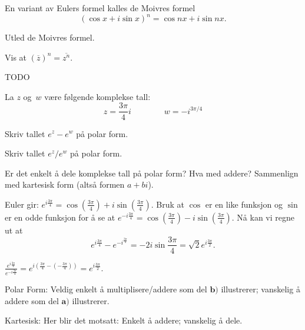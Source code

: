 \begin{oppgave}
En variant av Eulers formel kalles de Moivres formel
\[
(\cos x + i\sin x)^n=\cos nx + i\sin nx.
\]
\begin{punkt}
Utled de Moivres formel.
\end{punkt}

\begin{punkt}
Vis at $(\overline z)^n=\overline{z^n}$.
\end{punkt}
\end{oppgave}


\begin{losning}
TODO
\end{losning}


\begin{oppgave}
La $z$ og~$w$ være følgende komplekse tall:
\[
z = \frac{3\pi}{4} i
\qquad\qquad
w = -i^{3\pi/4}
\]
\begin{punkt}
Skriv tallet $e^z - e^w$ på polar form.
\end{punkt}

\begin{punkt}
Skriv tallet $e^z/e^w$ på polar form.
\end{punkt}

\begin{punkt}
Er det enkelt å dele komplekse tall på polar form?
Hva med addere?
Sammenlign med kartesisk form (altså formen $a + bi$).
\end{punkt}

\end{oppgave}

\begin{losning}

\begin{punkt}
Euler gir: $e^{i\frac{3\pi}{4}}=\cos(\frac{3\pi}{4})+i\sin (\frac{3\pi}{4})$. Bruk at $\cos$ er en like funksjon og $\sin$ er en odde funksjon for å se at $e^{-i\frac{3\pi}{4}}=\cos(\frac{3\pi}{4})-i\sin (\frac{3\pi}{4})$. Nå kan vi regne ut at $$e^{i\frac{3\pi}{4}}-e^{-i^\frac{3 \pi}{4}}=-2i\sin \frac{3\pi}{4}=\sqrt{2}e^{i\frac{3\pi}{2}}.$$
\end{punkt}

\begin{punkt}
$\frac{e^{i\frac{3\pi}{4}}}{e^{-i\frac{3 \pi}{4}}}=e^{i(\frac{3\pi}{4}-(-\frac{3 \pi}{4}))}=e^{i\frac{3\pi}{2}}.$ 
\end{punkt}

\begin{punkt}
Polar Form: Veldig enkelt å multiplisere/addere som del $\textbf{b)}$ illustrerer; vanskelig å addere som del $\textbf{a)}$ illustrerer.

\noindent
Kartesisk: Her blir det motsatt: Enkelt å addere; vanskelig å dele.
\end{punkt}

\end{losning}



